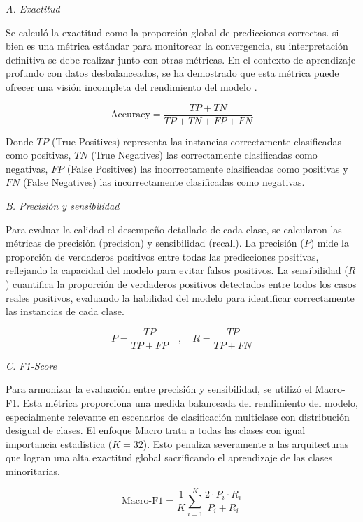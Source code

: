 \documentclass[preprint,number]{elsarticle}
\begin{document}
\textit{A. Exactitud}

Se calculó la exactitud como la proporción global de predicciones correctas. si bien es una métrica estándar para monitorear la convergencia, su interpretación definitiva se debe realizar junto con otras métricas. En el contexto de aprendizaje profundo con datos desbalanceados, se ha demostrado que esta métrica puede ofrecer una visión incompleta del rendimiento del modelo \cite{johnson2019survey}.

\begin{equation*}
    \text{Accuracy} = \frac{TP + TN}{TP + TN + FP + FN}
\end{equation*}

Donde $TP$ (True Positives) representa las instancias correctamente clasificadas como positivas, $TN$ (True Negatives) las correctamente clasificadas como negativas, $FP$ (False Positives) las incorrectamente clasificadas como positivas y $FN$ (False Negatives) las incorrectamente clasificadas como negativas.

\textit{B. Precisión y sensibilidad}

Para evaluar la calidad el desempeño detallado de cada clase, se calcularon las métricas de precisión (precision) y sensibilidad (recall). La precisión ($P$) mide la proporción de verdaderos positivos entre todas las predicciones positivas, reflejando la capacidad del modelo para evitar falsos positivos. La sensibilidad ($R$) cuantifica la proporción de verdaderos positivos detectados entre todos los casos reales positivos, evaluando la habilidad del modelo para identificar correctamente las instancias de cada clase.

\begin{equation*}
    P = \frac{TP}{TP + FP} \quad , \quad R = \frac{TP}{TP + FN}
\end{equation*}

\textit{C. F1-Score}

Para armonizar la evaluación entre precisión y sensibilidad, se utilizó el Macro-F1. Esta métrica proporciona una medida balanceada del rendimiento del modelo, especialmente relevante en escenarios de clasificación multiclase con distribución desigual de clases. El enfoque Macro trata a todas las clases con igual importancia estadística ($K=32$). Esto penaliza severamente a las arquitecturas que logran una alta exactitud global sacrificando el aprendizaje de las clases minoritarias.

\begin{equation*}
    \text{Macro-F1} = \frac{1}{K} \sum_{i=1}^{K} \frac{2 \cdot P_i \cdot R_i}{P_i + R_i}
\end{equation*}
\end{document}
